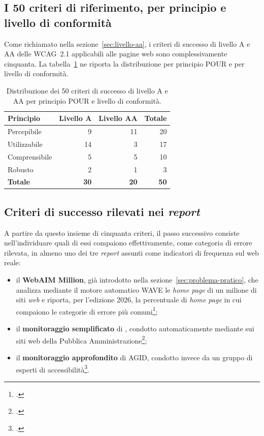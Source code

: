 \subsection{I 50 criteri di riferimento, per principio e livello di conformità}

Come richiamato nella sezione~\ref{sec:livello-aa}, i criteri di successo di livello A e AA delle WCAG~2.1 applicabili alle pagine web sono complessivamente cinquanta. La tabella~\ref{tab:distribuzione-pour} ne riporta la distribuzione per principio POUR e per livello di conformità.

\begin{table}[htbp]
\centering
\small
\caption{Distribuzione dei 50 criteri di successo di livello A e AA per principio POUR e livello di conformità.}
\label{tab:distribuzione-pour}
\begin{tabular}{|l|r|r|r|}
\hline
\textbf{Principio} & \textbf{Livello A} & \textbf{Livello AA} & \textbf{Totale} \\
\hline
Percepibile & 9 & 11 & 20 \\
\hline
Utilizzabile & 14 & 3 & 17 \\
\hline
Comprensibile & 5 & 5 & 10 \\
\hline
Robusto & 2 & 1 & 3 \\
\hline
\textbf{Totale} & \textbf{30} & \textbf{20} & \textbf{50} \\
\hline
\end{tabular}
\end{table}
\FloatBarrier

\subsection{Criteri di successo rilevati nei \emph{report}}

A partire da questo insieme di cinquanta criteri, il passo successivo consiste nell'individuare quali di essi compaiono effettivamente, come categoria di errore rilevata, in almeno uno dei tre \emph{report} assunti come indicatori di frequenza sul web reale: 

\begin{itemize}
\item il \textbf{WebAIM Million}, già introdotto nella sezione~\ref{sec:problema-pratico}, che analizza mediante il motore automatico WAVE le \emph{home page} di un milione di siti \emph{web} e riporta, per l'edizione 2026, la percentuale di \emph{home page} in cui compaiono le categorie di errore più comuni\footcite{webaim:million2026}; 
\item il \textbf{monitoraggio semplificato} di , condotto automaticamente mediante  sui siti web della Pubblica Amministrazione\footcite{agid:errori-semplificato}; 
\item il \textbf{monitoraggio approfondito} di AGID, condotto invece da un gruppo di esperti di accessibilità\footcite{agid:errori-approfondito}. 
\end{itemize}

